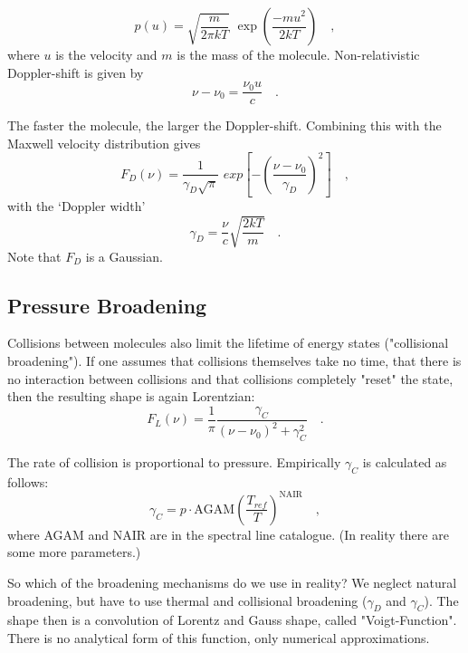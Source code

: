 \begin{equation}
p(u) = \sqrt{\frac{m}{2\pi kT}} \,\, \exp \left(\frac{-mu^{2}}{2kT}
\right)  \quad ,
\end{equation}
where $u$ is the velocity and $m$ is the mass of the molecule. 
Non-relativistic Doppler-shift is given by
\begin{equation}
\nu - \nu_{0} = \frac{\nu_{0}u}{c} \quad .
\end{equation}

The faster the molecule, the larger the Doppler-shift. Combining this
with the Maxwell velocity distribution gives
\begin{equation}
F_{D}(\nu) = \frac{1}{\gamma_{D}\sqrt{\pi}} \,\, exp \left[- \left( \frac{\nu
    - \nu_{0}}{\gamma_{D}} \right )^{2} \right] \quad ,
\end{equation}
with the `Doppler width'
\begin{equation}
  \gamma_{D} = \frac{\nu}{c} \sqrt{\frac{2kT}{m}} \quad .
\end{equation}
Note that $F_{D}$ is a Gaussian.  

\subsection{Pressure Broadening}

Collisions between molecules also limit the lifetime of energy states
("collisional broadening"). If one assumes that collisions themselves
take no time, that there is no interaction between collisions and that
collisions completely "reset" the state, then the resulting shape is
again Lorentzian:
\begin{equation}
F_{L}(\nu) = \frac{1}{\pi} \frac{\gamma_{C}}{(\nu - \nu_{0})^{2} +
  \gamma_{C}^{2}} \quad .
\end{equation}

The rate of collision is proportional to pressure. Empirically $\gamma_{C}$ is calculated as follows:
\begin{equation}
\gamma_{C} = p \cdot \mathrm{AGAM} \left( \frac{T_{ref}}{T} \right)^{\mathrm{NAIR}} \quad ,
\end{equation}
where AGAM and NAIR are in the spectral line catalogue. (In reality there are some more parameters.) 

So which of the broadening mechanisms do we use in reality? We neglect
natural broadening, but have to use thermal and collisional broadening
($\gamma_{D}$ and $\gamma_{C}$). The shape then is a convolution of
Lorentz and Gauss shape, called "Voigt-Function". There is no
analytical form of this function, only numerical approximations.

